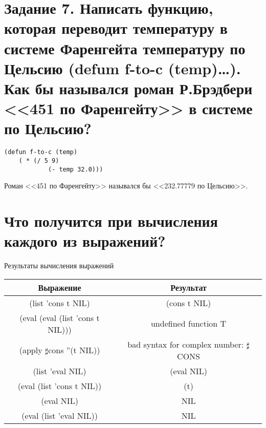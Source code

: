 \section{Задание 7. Написать функцию, которая переводит температуру в системе Фаренгейта температуру по Цельсию (defum f-to-c (temp)…). Как бы назывался роман Р.Брэдбери <<451 по Фаренгейту>> в системе по Цельсию?}

\begin{lstlisting}
(defun f-to-c (temp)
	( * (/ 5 9)
			(- temp 32.0)))
\end{lstlisting}

Роман <<451 по Фаренгейту>> назывался бы <<232.77779 по Цельсию>>.

\section{Что получится при вычисления каждого из выражений?}

\begin{center}
	\begin{threeparttable}
		\captionsetup{justification=raggedright,singlelinecheck=off}
		\caption{\label{8}Результаты вычисления выражений}
		\centering
		\begin{tabular}{|c|c|}
			\hline
			Выражение & Результат\\
			\hline
			(list 'cons t NIL) & (cons t NIL)\\
			\hline
			(eval (eval (list 'cons t NIL))) & undefined function T\\
			\hline
			(apply $\sharp$cons ''(t NIL)) & bad syntax for complex number: $\sharp$CONS\\
			\hline
			(list 'eval NIL) & (eval NIL)\\
			\hline
			(eval (list 'cons t NIL)) & (t)\\
			\hline
			(eval NIL) & NIL\\
			\hline
			(eval (list 'eval NIL)) & NIL\\
			\hline
		\end{tabular}
	\end{threeparttable}
\end{center}

\clearpage